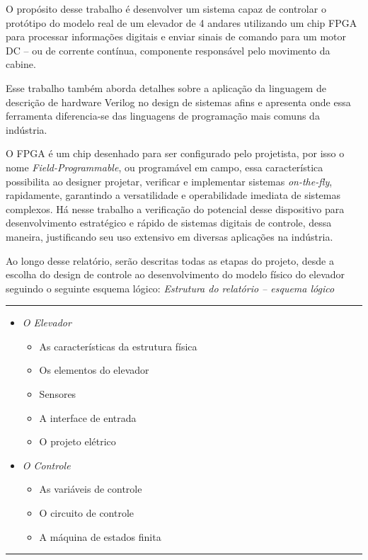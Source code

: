 \par O propósito desse trabalho é desenvolver um sistema capaz de controlar o
protótipo do modelo real de um elevador de 4 andares utilizando um chip FPGA
para processar informações digitais e enviar sinais de comando para um motor DC
-- ou de corrente contínua, componente responsável pelo movimento da cabine.
\par Esse trabalho também aborda detalhes sobre a aplicação da linguagem de
descrição de hardware Verilog no design de sistemas afins e apresenta onde essa 
ferramenta diferencia-se das linguagens de programação mais comuns da indústria.
\par O FPGA é um chip desenhado para ser configurado pelo projetista, por isso o
nome \textit{Field-Programmable}, ou programável em campo, essa característica
possibilita ao designer projetar, verificar e implementar sistemas 
\textit{on-the-fly}, rapidamente, garantindo a versatilidade e operabilidade
imediata de sistemas complexos. Há nesse trabalho a verificação do potencial desse 
dispositivo para desenvolvimento estratégico e rápido de sistemas digitais de 
controle, dessa maneira, justificando seu uso extensivo em diversas aplicações na 
indústria.
\par Ao longo desse relatório, serão descritas todas as etapas do projeto, desde a 
escolha do design de controle ao desenvolvimento do modelo físico do elevador
seguindo o seguinte esquema lógico:
\vfill
\emph{Estrutura do relatório -- esquema lógico}\vspace{2pt}
\normalsize
\hrule
\begin{center}
	\begin{itemize}
		\item \emph{O Elevador}
		\begin{itemize} \renewcommand{\labelitemi}{$\Rightarrow$}
			\item As características da estrutura física
			\item Os elementos do elevador
			\item Sensores
			\item A interface de entrada
			\item O projeto elétrico
		\end{itemize}
		\item \emph{O Controle}
		\begin{itemize} \renewcommand{\labelitemi}{$\Rightarrow$}
			\item As variáveis de controle 
			\item O circuito de controle 
			\item A máquina de estados finita 
		\end{itemize}
	\end{itemize}
\end{center}
\hrule
